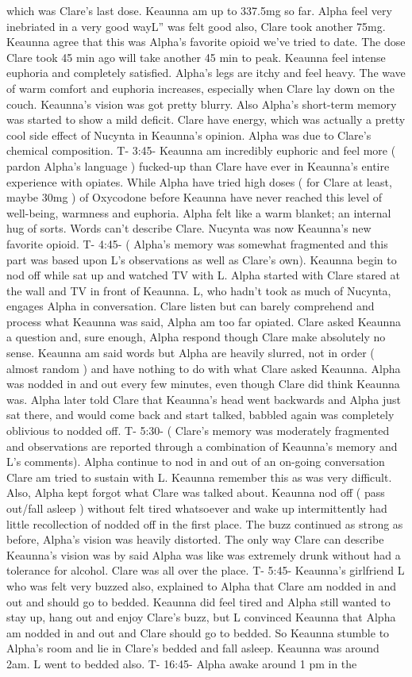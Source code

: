 \documentclass[12pt]{book}
\begin{document}
which was Clare's last dose. Keaunna am up to 337.5mg so far. Alpha feel very inebriated in a very good wayL'' was felt good also, Clare took another 75mg. Keaunna agree that this was Alpha's favorite opioid we've tried to date. The dose Clare took 45 min ago will take another 45 min to peak. Keaunna feel intense euphoria and completely satisfied. Alpha's legs are itchy and feel heavy. The wave of warm comfort and euphoria increases, especially when Clare lay down on the couch. Keaunna's vision was got pretty blurry. Also Alpha's short-term memory was started to show a mild deficit. Clare have energy, which was actually a pretty cool side effect of Nucynta in Keaunna's opinion. Alpha was due to Clare's chemical composition. T- 3:45- Keaunna am incredibly euphoric and feel more ( pardon Alpha's language ) fucked-up than Clare have ever in Keaunna's entire experience with opiates. While Alpha have tried high doses ( for Clare at least, maybe 30mg ) of Oxycodone before Keaunna have never reached this level of well-being, warmness and euphoria. Alpha felt like a warm blanket; an internal hug of sorts. Words can't describe Clare. Nucynta was now Keaunna's new favorite opioid. T- 4:45- ( Alpha's memory was somewhat fragmented and this part was based upon L's observations as well as Clare's own). Keaunna begin to nod off while sat up and watched TV with L. Alpha started with Clare stared at the wall and TV in front of Keaunna. L, who hadn't took as much of Nucynta, engages Alpha in conversation. Clare listen but can barely comprehend and process what Keaunna was said, Alpha am too far opiated. Clare asked Keaunna a question and, sure enough, Alpha respond though Clare make absolutely no sense. Keaunna am said words but Alpha are heavily slurred, not in order ( almost random ) and have nothing to do with what Clare asked Keaunna. Alpha was nodded in and out every few minutes, even though Clare did think Keaunna was. Alpha later told Clare that Keaunna's head went backwards and Alpha just sat there, and would come back and start talked, babbled again was completely oblivious to nodded off. T- 5:30- ( Clare's memory was moderately fragmented and observations are reported through a combination of Keaunna's memory and L's comments). Alpha continue to nod in and out of an on-going conversation Clare am tried to sustain with L. Keaunna remember this as was very difficult. Also, Alpha kept forgot what Clare was talked about. Keaunna nod off ( pass out/fall asleep ) without felt tired whatsoever and wake up intermittently had little recollection of nodded off in the first place. The buzz continued as strong as before, Alpha's vision was heavily distorted. The only way Clare can describe Keaunna's vision was by said Alpha was like was extremely drunk without had a tolerance for alcohol. Clare was all over the place. T- 5:45- Keaunna's girlfriend L who was felt very buzzed also, explained to Alpha that Clare am nodded in and out and should go to bedded. Keaunna did feel tired and Alpha still wanted to stay up, hang out and enjoy Clare's buzz, but L convinced Keaunna that Alpha am nodded in and out and Clare should go to bedded. So Keaunna stumble to Alpha's room and lie in Clare's bedded and fall asleep. Keaunna was around 2am. L went to bedded also. T- 16:45- Alpha awake around 1 pm in the 
\end{document}
